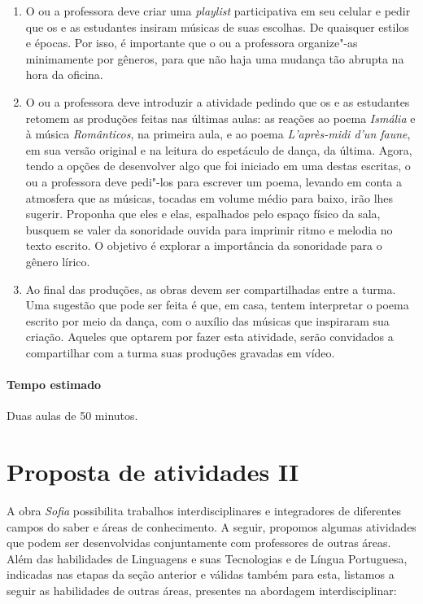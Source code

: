 \documentclass[12pt]{extarticle}
\begin{document}
\begin{enumerate}

  \item
  O ou a professora deve criar uma \textit{playlist} participativa em seu celular
  e pedir que os e as estudantes insiram músicas de suas escolhas. De quaisquer
  estilos e épocas. Por isso, é importante que o ou a professora 
  organize"-as minimamente por gêneros, para que não haja uma mudança tão abrupta
  na hora da oficina. 


  \item
  O ou a professora deve introduzir a atividade pedindo que os e as estudantes
  retomem as produções feitas nas últimas aulas: as reações ao poema \textit{Ismália}
  e à música \textit{Românticos}, na primeira aula, e ao poema \textit{L'après-midi d'un faune},
  em sua versão original e na leitura do espetáculo de dança, da última. Agora,
  tendo a opções de desenvolver algo que foi iniciado em uma destas escritas,
  o ou a professora deve pedi"-los para escrever um poema, levando em conta a
  atmosfera que as músicas, tocadas em volume médio para baixo, irão lhes sugerir. 
  Proponha que eles e elas, espalhados pelo espaço físico da sala, 
  busquem se valer da sonoridade ouvida para imprimir ritmo e
  melodia no texto escrito. O objetivo é explorar a importância da sonoridade
  para o gênero lírico.

  \item
  Ao final das produções, as obras devem ser compartilhadas entre a turma. 
  Uma sugestão que pode ser feita é que, em casa, tentem interpretar o poema
  escrito por meio da dança, com o auxílio das músicas que inspiraram sua criação.
  Aqueles que optarem por fazer esta atividade, serão convidados a compartilhar 
  com a turma suas produções gravadas em vídeo.


\end{enumerate}

\paragraph{Tempo estimado} Duas aulas de 50 minutos.




\section{Proposta de atividades II}

A obra \emph{\textit{Sofia}} possibilita trabalhos interdisciplinares e integradores de
diferentes campos do saber e áreas de conhecimento. A seguir, propomos algumas
atividades que podem ser desenvolvidas conjuntamente com professores de outras
áreas. Além das habilidades de Linguagens e suas Tecnologias e de Língua
Portuguesa, indicadas nas etapas da seção anterior e válidas também para esta,
listamos a seguir as habilidades de outras áreas, presentes na abordagem
interdisciplinar:
\end{document}
